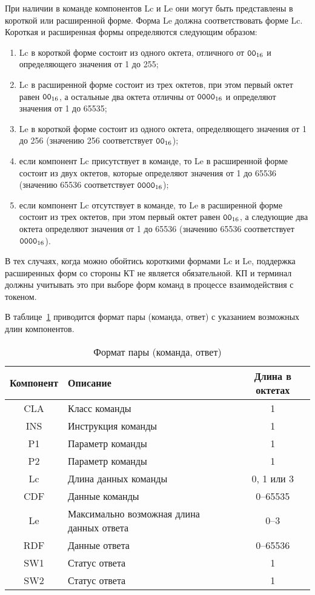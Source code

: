 При наличии в команде компонентов Lc и Le они могут быть представлены 
в короткой или расширенной форме. Форма Le должна соответствовать форме Lc. 
%
Короткая и расширенная формы определяются следующим образом: 
\begin{enumerate}
\item[1)]
Lc в короткой форме состоит из одного октета, отличного от $\texttt{00}_{16}$ и 
определяющего значения от 1 до 255; 

\item[2)] 
Lc в расширенной форме состоит из трех октетов, при этом первый октет 
равен $\texttt{00}_{16}$, а остальные два октета отличны от 
$\texttt{0000}_{16}$ и определяют значения от 1 до 65535; 

\item[3)] 
Le в короткой форме состоит из одного октета, определяющего значения 
от 1 до 256 (значению 256 соответствует $\texttt{00}_{16}$); 

\item[4)] 
если компонент Lc присутствует в команде, то Le в расширенной форме 
состоит из двух октетов, которые определяют значения от 1 до 65536 
(значению 65536 соответствует $\texttt{0000}_{16}$); 

\item[5)] 
если компонент Lc отсутствует в команде, то Le в расширенной форме 
состоит из трех октетов, при этом первый октет равен $\texttt{00}_{16}$,
а следующие два октета определяют значения от 1 до 65536
(значению 65536 соответствует $\texttt{0000}_{16}$).
\end{enumerate}

В тех случаях, когда можно обойтись короткими формами Lc и Le, 
поддержка расширенных форм со стороны КТ не является обязательной.
КП и терминал должны учитывать это при выборе форм команд в процессе 
взаимодействия с токеном.

В таблице~\ref{Table.CMDS.Fmt} приводится формат пары (команда, ответ) 
с указанием возможных длин компонентов.

\begin{table}[h!]
\caption{Формат пары (команда, ответ)}\label{Table.CMDS.Fmt}
\begin{tabular}{|c|p{10.5cm}|c|}
\hline
Компонент & Описание & Длина в октетах \\
\hline
\hline
CLA & Класс команды & 1 \\
\hline
INS & Инструкция команды & 1 \\
\hline
P1 & Параметр команды & 1 \\
\hline
P2 & Параметр команды & 1 \\
\hline
Lc & Длина данных команды & 0, 1 или 3  \\
\hline
CDF & Данные команды & 0--65535 \\
\hline
Le & Максимально возможная длина данных ответа & 0--3 
\\
\hline
RDF & Данные ответа & 0--65536 \\
\hline
SW1 & Статус ответа & 1 \\
\hline
SW2 & Статус ответа & 1 \\
\hline
\end{tabular}
\end{table}

